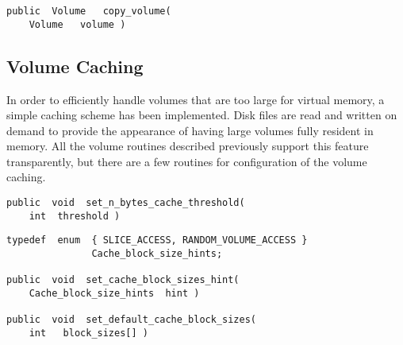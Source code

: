 {\bf\begin{verbatim}
public  Volume   copy_volume(
    Volume   volume )
\end{verbatim}}


\subsection{Volume Caching}

In order to efficiently handle volumes that are too large for virtual
memory, a simple caching scheme has been implemented.  Disk files are
read and written on demand to provide the appearance of having large
volumes fully resident in memory.  All the volume routines described
previously support this feature transparently, but there are a few
routines for configuration of the volume caching.

{\bf\begin{verbatim}
public  void  set_n_bytes_cache_threshold(
    int  threshold )
\end{verbatim}}


{\bf\begin{verbatim}
typedef  enum  { SLICE_ACCESS, RANDOM_VOLUME_ACCESS }
               Cache_block_size_hints;

public  void  set_cache_block_sizes_hint(
    Cache_block_size_hints  hint )

public  void  set_default_cache_block_sizes(
    int   block_sizes[] )
\end{verbatim}}

